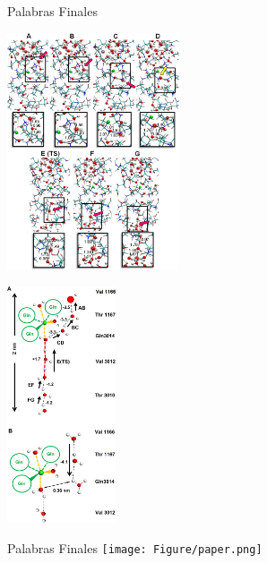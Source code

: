 \documentclass[8pt]{beamer}
\begin{document}
\begin{frame}[t]{Palabras Finales}
\hspace{-0.5cm}
\begin{minipage}[t]{0.6\textwidth}
\centering
\includegraphics[height=7cm]{Figure/grothuss.png}
\end{minipage}
\begin{minipage}[t]{0.4\textwidth}
\centering
\includegraphics[height=7cm]{Figure/grothuss_2.png}
\end{minipage}
\end{frame}

\begin{frame}[t]{Palabras Finales}
\centering
\texttt{[image: Figure/paper.png]}
\end{frame}
\end{document}
